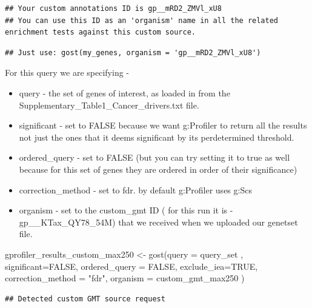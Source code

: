 \documentclass[
]{book}
\newenvironment{Shaded}{\begin{snugshade}}{\end{snugshade}}
\newcommand{\AttributeTok}[1]{\textcolor[rgb]{0.77,0.63,0.00}{#1}}
\newcommand{\ConstantTok}[1]{\textcolor[rgb]{0.00,0.00,0.00}{#1}}
\newcommand{\FunctionTok}[1]{\textcolor[rgb]{0.00,0.00,0.00}{#1}}
\newcommand{\NormalTok}[1]{#1}
\newcommand{\OtherTok}[1]{\textcolor[rgb]{0.56,0.35,0.01}{#1}}
\newcommand{\StringTok}[1]{\textcolor[rgb]{0.31,0.60,0.02}{#1}}
\providecommand{\tightlist}{%
  \setlength{\itemsep}{0pt}\setlength{\parskip}{0pt}}
\begin{document}
\begin{verbatim}
## Your custom annotations ID is gp__mRD2_ZMVl_xU8
## You can use this ID as an 'organism' name in all the related enrichment tests against this custom source.
\end{verbatim}

\begin{verbatim}
## Just use: gost(my_genes, organism = 'gp__mRD2_ZMVl_xU8')
\end{verbatim}

For this query we are specifying -

\begin{itemize}
\tightlist
\item
  query - the set of genes of interest, as loaded in from the Supplementary\_Table1\_Cancer\_drivers.txt file.
\item
  significant - set to FALSE because we want g:Profiler to return all the results not just the ones that it deems significant by its perdetermined threshold.
\item
  ordered\_query - set to FALSE (but you can try setting it to true as well because for this set of genes they are ordered in order of their significance)
\item
  correction\_method - set to fdr. by default g:Profiler uses g:Scs
\item
  organism - set to the custom\_gmt ID ( for this run it is - gp\_\_KTax\_QY78\_54M) that we received when we uploaded our genetset file.
\end{itemize}

\begin{Shaded}
\begin{Highlighting}[]
\NormalTok{gprofiler\_results\_custom\_max250 }\OtherTok{\textless{}{-}} \FunctionTok{gost}\NormalTok{(}\AttributeTok{query =}\NormalTok{ query\_set ,}
                                     \AttributeTok{significant=}\ConstantTok{FALSE}\NormalTok{,}
                                 \AttributeTok{ordered\_query =} \ConstantTok{FALSE}\NormalTok{,}
                                  \AttributeTok{exclude\_iea=}\ConstantTok{TRUE}\NormalTok{,}
                                     \AttributeTok{correction\_method =} \StringTok{"fdr"}\NormalTok{,}
                                 \AttributeTok{organism =}\NormalTok{ custom\_gmt\_max250}
\NormalTok{                                     )}
\end{Highlighting}
\end{Shaded}

\begin{verbatim}
## Detected custom GMT source request
\end{verbatim}
\end{document}
